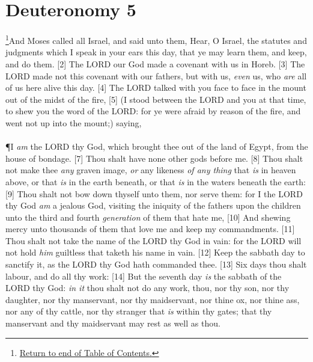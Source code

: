 \chapter{Deuteronomy 5}
\footnote{\textcolor[rgb]{0.00,0.25,0.00}{\hyperlink{DeuteronomyTOC}{Return to end of Table of Contents.}}}\textcolor[rgb]{0.00,0.00,1.00}{And Moses called all Israel, and said unto them, Hear, O Israel, the statutes and judgments which I speak in your ears this day, that ye may learn them, and keep, and do them.}
[2] \textcolor[rgb]{0.00,0.00,1.00}{The LORD our God made a covenant with us in Horeb.}
[3] \textcolor[rgb]{0.00,0.00,1.00}{The LORD made not this covenant with our fathers, but with us, \emph{even} us, who \emph{are} all of us here alive this day.}
[4] \textcolor[rgb]{0.00,0.00,1.00}{The LORD talked with you face to face in the mount out of the midst of the fire,}
[5] \textcolor[rgb]{0.00,0.00,1.00}{(I stood between the LORD and you at that time, to shew you the word of the LORD: for ye were afraid by reason of the fire, and went not up into the mount;) saying,}\\
\\
\P \textcolor[rgb]{0.00,0.00,1.00}{I \emph{am} the LORD thy God, which brought thee out of the land of Egypt, from the house of bondage.}
[7] \textcolor[rgb]{0.00,0.00,1.00}{Thou shalt have none other gods before me.}
[8] \textcolor[rgb]{0.00,0.00,1.00}{Thou shalt not make thee \emph{any} graven image, \emph{or} any likeness \emph{of any thing} that \emph{is} in heaven above, or that \emph{is} in the earth beneath, or that \emph{is} in the waters beneath the earth:}
[9] \textcolor[rgb]{0.00,0.00,1.00}{Thou shalt not bow down thyself unto them, nor serve them: for I the LORD thy God \emph{am} a jealous God, visiting the iniquity of the fathers upon the children unto the third and fourth \emph{generation} of them that hate me,}
[10] \textcolor[rgb]{0.00,0.00,1.00}{And shewing mercy unto thousands of them that love me and keep my commandments.}
[11] \textcolor[rgb]{0.00,0.00,1.00}{Thou shalt not take the name of the LORD thy God in vain: for the LORD will not hold \emph{him} guiltless that taketh his name in vain.}
[12] \textcolor[rgb]{0.00,0.00,1.00}{Keep the sabbath day to sanctify it, as the LORD thy God hath commanded thee.}
[13] \textcolor[rgb]{0.00,0.00,1.00}{Six days thou shalt labour, and do all thy work:}
[14] \textcolor[rgb]{0.00,0.00,1.00}{But the seventh day \emph{is} the sabbath of the LORD thy God: \emph{in it} thou shalt not do any work, thou, nor thy son, nor thy daughter, nor thy manservant, nor thy maidservant, nor thine ox, nor thine ass, nor any of thy cattle, nor thy stranger that \emph{is} within thy gates; that thy manservant and thy maidservant may rest as well as thou.}
